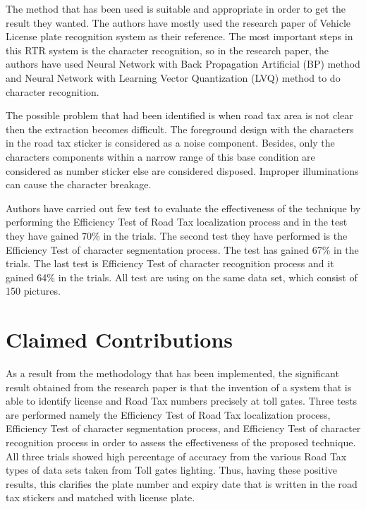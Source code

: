 \documentclass[12pt]{article}
\begin{document}
The method that has been used is suitable and appropriate in order to get the result they wanted. The authors have mostly used the research paper of Vehicle License plate recognition system as their reference. The most important steps in this RTR system is the character recognition, so in the research paper, the authors have used Neural Network with Back Propagation Artificial (BP) method and Neural Network with Learning Vector Quantization (LVQ) method to do character recognition.  

The possible problem that had been identified is when road tax area is not clear then the extraction becomes difficult. The foreground design with the characters in the road tax sticker is considered as a noise component. Besides, only the characters components within a narrow range of this base condition are considered as number sticker else are considered disposed. Improper illuminations can cause the character breakage.

Authors have carried out few test to evaluate the effectiveness of the technique by performing the Efficiency Test of Road Tax localization process and in the test they have gained 70\% in the trials. The second test they have performed is the Efficiency Test of character segmentation process. The test has gained 67\% in the trials. The last test is Efficiency Test of character recognition process and it gained 64\% in the trials. All test are using on the same data set, which consist of 150 pictures. 

\section{Claimed Contributions}
As a result from the methodology that has been implemented, the significant result obtained from the research paper is that the invention of a system that is able to identify license and Road Tax numbers precisely at toll gates. Three tests are performed namely the Efficiency Test of Road Tax localization process, Efficiency Test of character segmentation process, and Efficiency Test of character recognition process in order to assess the effectiveness of the proposed technique. All three trials showed high percentage of accuracy from the various Road Tax types of data sets taken from Toll gates lighting. Thus, having these positive results, this clarifies the plate number and expiry date that is written in the road tax stickers and matched with license plate.
\end{document}
